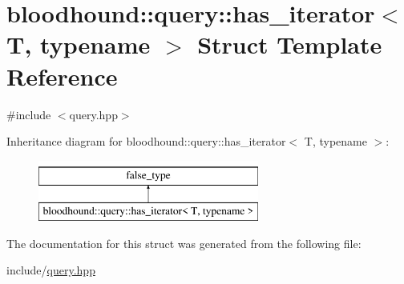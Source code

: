 \hypertarget{structbloodhound_1_1query_1_1has__iterator}{}\section{bloodhound\+:\+:query\+:\+:has\+\_\+iterator$<$ T, typename $>$ Struct Template Reference}
\label{structbloodhound_1_1query_1_1has__iterator}


{\ttfamily \#include $<$query.\+hpp$>$}

Inheritance diagram for bloodhound\+:\+:query\+:\+:has\+\_\+iterator$<$ T, typename $>$\+:\begin{figure}[H]
\begin{center}
\leavevmode
\includegraphics[height=2.000000cm]{structbloodhound_1_1query_1_1has__iterator}
\end{center}
\end{figure}


The documentation for this struct was generated from the following file\+:\begin{DoxyCompactItemize}
\item 
include/\mbox{\hyperlink{query_8hpp}{query.\+hpp}}\end{DoxyCompactItemize}
